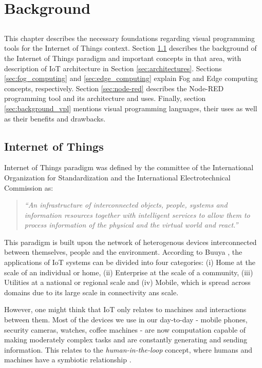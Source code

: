 \chapter{Background} \label{chap:background}

\section*{}


This chapter describes the necessary foundations regarding visual programming tools for the Internet of Things context. Section \ref{sec:background_iot} describes the background of the Internet of Things paradigm and important concepts in that area, with description of IoT architecture in Section \ref{sec:architectures}. Sections \ref{sec:fog_computing} and \ref{sec:edge_computing} explain Fog and Edge computing concepts, respectively. Section \ref{sec:node-red} describes the Node-RED programming tool and its architecture and uses. Finally, section \ref{sec:background_vpl} mentions visual programming languages, their uses as well as their benefits and drawbacks.

\section{Internet of Things}\label{sec:background_iot}

Internet of Things paradigm was defined by the committee of the International Organization for Standardization and the International Electrotechnical Commission \cite{ISOIEC} as:
\begin{quote}
    \emph{“An infrastructure of interconnected objects, people, systems and information resources together with intelligent services to allow them to process information of the physical and the virtual world and react.”}
\end{quote}
\par This paradigm is built upon the network of heterogenous devices interconnected between themselves, people and the environment. According to Buuya \cite{iot_future_direction}, the applications of IoT systems can be divided into four categories: (i) Home at the scale of an individual or home, (ii) Enterprise at the scale of a community, (iii) Utilities at a national or regional scale and (iv) Mobile, which is spread across domains due to its large scale in connectivity ans scale. 
\par However, one might think that IoT only relates to machines and interactions between them. Most of the devices we use in our day-to-day - mobile phones, security cameras, watches, coffee machines - are now computation capable of making moderately complex tasks and are constantly generating and sending information. This relates to the \emph{human-in-the-loop} concept, where humans and machines have a symbiotic relationship \cite{human_in_the_loop_survey}.
 

